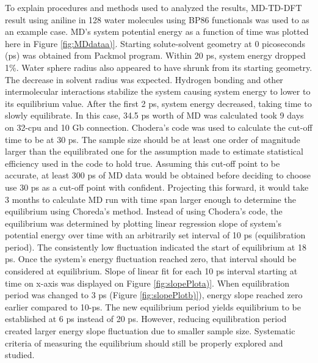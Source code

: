 \documentclass[
journal=jpcbfk, %
manuscript=article]{achemso}
\begin{document}
To explain procedures and methods used to analyzed the results, MD-TD-DFT result using aniline in 128 water molecules using BP86 functionals was used to as an example case. MD's system potential energy as a function of time was plotted here in Figure \ref{fig:MDdataa)}. Starting solute-solvent geometry at 0 picoseconds (ps) was obtained from Packmol program. Within 20 ps, system energy dropped 1\%. Water sphere radius also appeared to have shrunk from its starting geometry. The decrease in solvent radius was expected. Hydrogen bonding and other intermolecular interactions stabilize the system causing system energy to lower to its equilibrium value. After the first 2 ps, system energy decreased, taking time to slowly equilibrate. In this case, 34.5 ps worth of MD was calculated took 9 days on 32-cpu and 10 Gb connection. Chodera's code\cite{Chodera2015} was used to calculate the cut-off time to be at 30 ps. The sample size should be at least one order of magnitude larger than the equilibrated one for the assumption made to estimate statistical efficiency used in the code to hold true. Assuming this cut-off point to be accurate, at least 300 ps of MD data would be obtained before deciding to choose use 30 ps as a cut-off point with confident. Projecting this forward, it would take 3 months to calculate MD run with time span larger enough to determine the equilibrium using Choreda's method. Instead of using Chodera's code, the equilibrium was determined by plotting linear regression slope of system's potential energy over time with an arbitrarily set interval of 10 ps (equilibration period). The consistently low fluctuation indicated the start of equilibrium at 18 ps. Once the system's energy fluctuation reached zero, that interval should be considered at equilibrium. Slope of linear fit for each 10 ps interval starting at time on x-axis was displayed on Figure \ref{fig:slopePlota)}. When equilibration period was changed to 3 ps (Figure \ref{fig:slopePlotb)}), energy slope reached zero earlier compared to 10-ps. The new equilibrium period yields equilibrium to be established at 6 ps instead of 20 ps. However, reducing equilibration period created larger energy slope fluctuation due to smaller sample size. Systematic criteria of measuring the equilibrium should still be properly explored and studied. 
\end{document}
